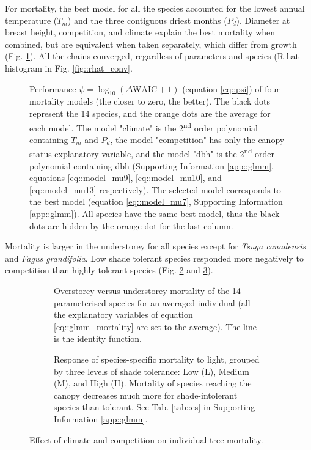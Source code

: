 For mortality, the best model for all the species accounted for the lowest annual temperature ($ T_m $) and the three contiguous driest months ($ P_d $). Diameter at breast height, competition, and climate explain the best mortality when combined, but are equivalent when taken separately, which differ from growth (Fig. \ref{fig::delta_waic}). All the chains converged, regardless of parameters and species (R-hat histogram in Fig. \ref{fig::rhat_conv}. 
\begin{figure}
	\centering
	
	\caption{Performance $ \psi = \log_{10}(\Delta \text{WAIC} + 1) $ (equation \ref{eq::psi}) of four mortality models (the closer to zero, the better). The black dots represent the 14 species, and the orange dots are the average for each model. The model "climate" is the 2\textsuperscript{nd} order polynomial containing $ T_m $ and $ P_d $, the model "competition" has only the canopy status explanatory variable, and the model "dbh" is the 2\textsuperscript{nd} order polynomial containing dbh (Supporting Information \ref{app::glmm}, equations \eqref{eq::model_mu9}, \eqref{eq::model_mu10}, and \eqref{eq::model_mu13} respectively). The selected model corresponds to the best model (equation \eqref{eq::model_mu7}, Supporting Information \ref{app::glmm}). All species have the same best model, thus the black dots are hidden by the orange dot for the last column. \label{fig::delta_waic}}
\end{figure}
Mortality is larger in the understorey for all species except for \textit{Tsuga canadensis} and \textit{Fagus grandifolia}. Low shade tolerant species responded more negatively to competition than highly tolerant species (Fig. \ref{fig::over_under_mu} and \ref{fig::groups_mu}).
\begin{figure}
\begin{subfigure}[t]{.48\textwidth}
	\centering
	
	\caption{Overstorey versus understorey mortality of the 14 parameterised species for an averaged individual (\ie all the explanatory variables of equation \eqref{eq::glmm_mortality} are set to the average). The line is the identity function.}
	\label{fig::over_under_mu}
\end{subfigure}
\hfill
\begin{subfigure}[t]{.48\textwidth}
	\centering
	
	\caption{Response of species-specific mortality to light, grouped by three levels of shade tolerance: Low (L), Medium (M), and High (H). Mortality of species reaching the canopy decreases much more for shade-intolerant species than tolerant. See Tab. \ref{tab::cs} in Supporting Information \ref{app::glmm}.}
	\label{fig::groups_mu}
\end{subfigure}
\caption{Effect of climate and competition on individual tree mortality.}
\label{fig::mortalityResults}
\end{figure}

